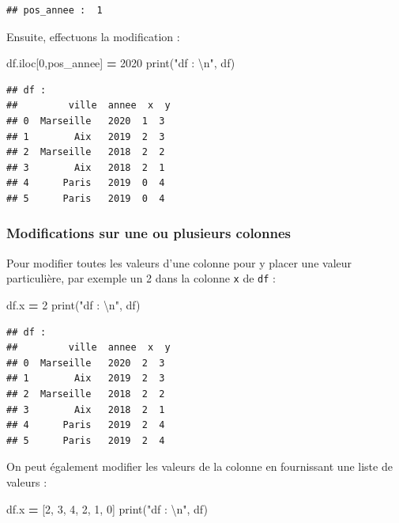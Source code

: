 \documentclass[
  12pt,
]{book}
\newenvironment{Shaded}{\begin{snugshade}}{\end{snugshade}}
\newcommand{\BuiltInTok}[1]{#1}
\newcommand{\CharTok}[1]{\textcolor[rgb]{0.31,0.60,0.02}{#1}}
\newcommand{\DecValTok}[1]{\textcolor[rgb]{0.00,0.00,0.81}{#1}}
\newcommand{\NormalTok}[1]{#1}
\newcommand{\OperatorTok}[1]{\textcolor[rgb]{0.81,0.36,0.00}{\textbf{#1}}}
\newcommand{\StringTok}[1]{\textcolor[rgb]{0.31,0.60,0.02}{#1}}
\numberwithin{equation}{section}
\numberwithin{countremarque}{section}
\begin{document}
\begin{lstlisting}
## pos_annee :  1
\end{lstlisting}

Ensuite, effectuons la modification :

\begin{Shaded}
\begin{Highlighting}[]
\NormalTok{df.iloc[}\DecValTok{0}\NormalTok{,pos\_annee] }\OperatorTok{=} \DecValTok{2020}
\BuiltInTok{print}\NormalTok{(}\StringTok{"df : }\CharTok{\textbackslash{}n}\StringTok{"}\NormalTok{, df)}
\end{Highlighting}
\end{Shaded}

\begin{lstlisting}
## df : 
##         ville  annee  x  y
## 0  Marseille   2020  1  3
## 1        Aix   2019  2  3
## 2  Marseille   2018  2  2
## 3        Aix   2018  2  1
## 4      Paris   2019  0  4
## 5      Paris   2019  0  4
\end{lstlisting}

\subsubsection{Modifications sur une ou plusieurs colonnes}\label{modifications-sur-une-ou-plusieurs-colonnes}

Pour modifier toutes les valeurs d'une colonne pour y placer une valeur particulière, par exemple un 2 dans la colonne \texttt{x} de \texttt{df} :

\begin{Shaded}
\begin{Highlighting}[]
\NormalTok{df.x }\OperatorTok{=} \DecValTok{2}
\BuiltInTok{print}\NormalTok{(}\StringTok{"df : }\CharTok{\textbackslash{}n}\StringTok{"}\NormalTok{, df)}
\end{Highlighting}
\end{Shaded}

\begin{lstlisting}
## df : 
##         ville  annee  x  y
## 0  Marseille   2020  2  3
## 1        Aix   2019  2  3
## 2  Marseille   2018  2  2
## 3        Aix   2018  2  1
## 4      Paris   2019  2  4
## 5      Paris   2019  2  4
\end{lstlisting}

On peut également modifier les valeurs de la colonne en fournissant une liste de valeurs :

\begin{Shaded}
\begin{Highlighting}[]
\NormalTok{df.x }\OperatorTok{=}\NormalTok{ [}\DecValTok{2}\NormalTok{, }\DecValTok{3}\NormalTok{, }\DecValTok{4}\NormalTok{, }\DecValTok{2}\NormalTok{, }\DecValTok{1}\NormalTok{, }\DecValTok{0}\NormalTok{]}
\BuiltInTok{print}\NormalTok{(}\StringTok{"df : }\CharTok{\textbackslash{}n}\StringTok{"}\NormalTok{, df)}
\end{Highlighting}
\end{Shaded}
\end{document}
